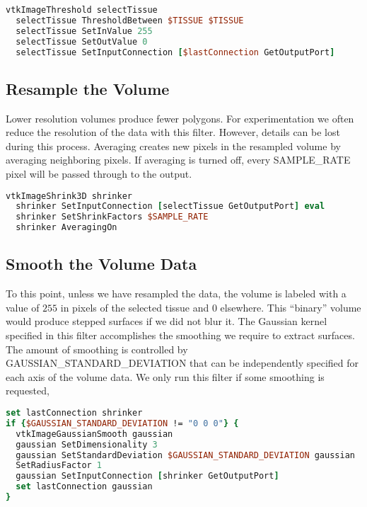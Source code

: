 \begin{lstlisting}[language=TCL, caption={Select a Tissue.}]
vtkImageThreshold selectTissue
  selectTissue ThresholdBetween $TISSUE $TISSUE
  selectTissue SetInValue 255
  selectTissue SetOutValue 0
  selectTissue SetInputConnection [$lastConnection GetOutputPort]
\end{lstlisting}

\subsection{Resample the Volume}

Lower resolution volumes produce fewer polygons. For experimentation we often reduce the resolution of the data with this filter. However, details can be lost during this process. Averaging creates new pixels in the resampled volume by averaging neighboring pixels. If averaging is turned off, every SAMPLE\_RATE pixel will be passed through to the output.

\begin{lstlisting}[language=TCL, caption={Resample the Volume.}]
vtkImageShrink3D shrinker
  shrinker SetInputConnection [selectTissue GetOutputPort] eval
  shrinker SetShrinkFactors $SAMPLE_RATE
  shrinker AveragingOn
\end{lstlisting}

\subsection{Smooth the Volume Data}

To this point, unless we have resampled the data, the volume is labeled with a value of $255$ in pixels of the selected tissue and $0$ elsewhere. This ``binary'' volume would produce stepped surfaces if we did not blur it. The Gaussian kernel specified in this filter accomplishes the smoothing we require to extract surfaces. The amount of smoothing is controlled by  GAUSSIAN\_STANDARD\_DEVIATION that can be independently specified for each axis of the volume data. We only run this filter if some smoothing is requested,

\begin{lstlisting}[language=TCL, caption={Smooth the Volume Data.}]
set lastConnection shrinker
if {$GAUSSIAN_STANDARD_DEVIATION != "0 0 0"} {
  vtkImageGaussianSmooth gaussian
  gaussian SetDimensionality 3
  gaussian SetStandardDeviation $GAUSSIAN_STANDARD_DEVIATION gaussian
  SetRadiusFactor 1
  gaussian SetInputConnection [shrinker GetOutputPort]
  set lastConnection gaussian
}
\end{lstlisting}

